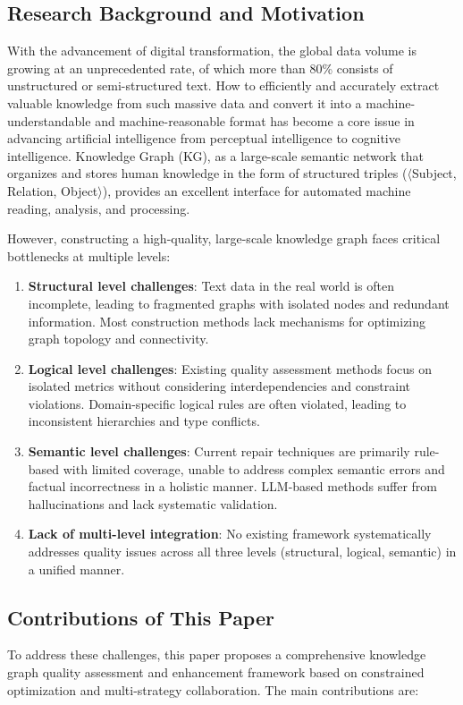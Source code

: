 \documentclass[runningheads]{llncs}
\begin{document}
\subsection{Research Background and Motivation}
With the advancement of digital transformation, the global data volume is growing at an unprecedented rate, of which more than 80\% consists of unstructured or semi-structured text. How to efficiently and accurately extract valuable knowledge from such massive data and convert it into a machine-understandable and machine-reasonable format has become a core issue in advancing artificial intelligence from perceptual intelligence to cognitive intelligence. Knowledge Graph (KG), as a large-scale semantic network that organizes and stores human knowledge in the form of structured triples ($\langle$Subject, Relation, Object$\rangle$), provides an excellent interface for automated machine reading, analysis, and processing.

However, constructing a high-quality, large-scale knowledge graph faces critical bottlenecks at multiple levels:

\begin{enumerate}
    \item \textbf{Structural level challenges}: Text data in the real world is often incomplete, leading to fragmented graphs with isolated nodes and redundant information. Most construction methods lack mechanisms for optimizing graph topology and connectivity.
    \item \textbf{Logical level challenges}: Existing quality assessment methods focus on isolated metrics without considering interdependencies and constraint violations. Domain-specific logical rules are often violated, leading to inconsistent hierarchies and type conflicts.
    \item \textbf{Semantic level challenges}: Current repair techniques are primarily rule-based with limited coverage, unable to address complex semantic errors and factual incorrectness in a holistic manner. LLM-based methods suffer from hallucinations and lack systematic validation.
    \item \textbf{Lack of multi-level integration}: No existing framework systematically addresses quality issues across all three levels (structural, logical, semantic) in a unified manner.
\end{enumerate}

\subsection{Contributions of This Paper}
To address these challenges, this paper proposes a comprehensive knowledge graph quality assessment and enhancement framework based on constrained optimization and multi-strategy collaboration. The main contributions are:
\end{document}
